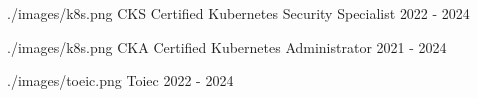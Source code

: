 

\begin{cvcerts}

  \cvcert
    {./images/k8s.png}
    {CKS} 
    {Certified Kubernetes Security Specialist} 
    {2022 - 2024}

  \cvcert
    {./images/k8s.png}
    {CKA} 
    {Certified Kubernetes Administrator} 
    {2021 - 2024}

  \cvcert
    {./images/toeic.png}
    {Toiec} 
    {}
    {2022 - 2024}

\end{cvcerts}
